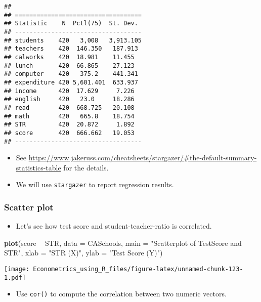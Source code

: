 \documentclass[]{book}
\newenvironment{Shaded}{\begin{snugshade}}{\end{snugshade}}
\newcommand{\DataTypeTok}[1]{\textcolor[rgb]{0.13,0.29,0.53}{#1}}
\newcommand{\KeywordTok}[1]{\textcolor[rgb]{0.13,0.29,0.53}{\textbf{#1}}}
\newcommand{\NormalTok}[1]{#1}
\newcommand{\OperatorTok}[1]{\textcolor[rgb]{0.81,0.36,0.00}{\textbf{#1}}}
\newcommand{\StringTok}[1]{\textcolor[rgb]{0.31,0.60,0.02}{#1}}
\providecommand{\tightlist}{%
  \setlength{\itemsep}{0pt}\setlength{\parskip}{0pt}}
\begin{document}
\begin{verbatim}
## 
## ===================================
## Statistic    N  Pctl(75)  St. Dev. 
## -----------------------------------
## students    420   3,008   3,913.105
## teachers    420  146.350   187.913 
## calworks    420  18.981    11.455  
## lunch       420  66.865    27.123  
## computer    420   375.2    441.341 
## expenditure 420 5,601.401  633.937 
## income      420  17.629     7.226  
## english     420   23.0     18.286  
## read        420  668.725   20.108  
## math        420   665.8    18.754  
## STR         420  20.872     1.892  
## score       420  666.662   19.053  
## -----------------------------------
\end{verbatim}

\begin{itemize}
\tightlist
\item
  See \url{https://www.jakeruss.com/cheatsheets/stargazer/\#the-default-summary-statistics-table} for the details.
\item
  We will use \texttt{stargazer} to report regression results.
\end{itemize}

\hypertarget{scatter-plot}{%
\subsubsection{Scatter plot}\label{scatter-plot}}

\begin{itemize}
\tightlist
\item
  Let's see how test score and student-teacher-ratio is correlated.
\end{itemize}

\begin{Shaded}
\begin{Highlighting}[]
\KeywordTok{plot}\NormalTok{(score }\OperatorTok{~}\StringTok{ }\NormalTok{STR, }
     \DataTypeTok{data =}\NormalTok{ CASchools,}
     \DataTypeTok{main =} \StringTok{"Scatterplot of TestScore and STR"}\NormalTok{, }
     \DataTypeTok{xlab =} \StringTok{"STR (X)"}\NormalTok{,}
     \DataTypeTok{ylab =} \StringTok{"Test Score (Y)"}\NormalTok{)}
\end{Highlighting}
\end{Shaded}

\texttt{[image: Econometrics\_using\_R\_files/figure-latex/unnamed-chunk-123-1.pdf]}

\begin{itemize}
\tightlist
\item
  Use \texttt{cor()} to compute the correlation between two numeric vectors.
\end{itemize}
\end{document}
